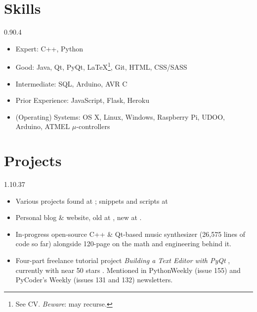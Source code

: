 \section{Skills}{0.9}{0.4}

\begin{multicols}{2}
	\begin{itemize}
		\item Expert: C++, Python
		\item Good: Java, Qt, PyQt, \LaTeX\footnote{See CV. \emph{Beware}: may recurse.}, Git, HTML, CSS/SASS
		\item Intermediate: SQL, Arduino, AVR C
		\item Prior Experience: JavaScript, Flask, Heroku
		\item (Operating) Systems: OS X, Linux, Windows, Raspberry Pi, UDOO, Arduino, ATMEL $\mu$-controllers
		\vspace{5cm}
	\end{itemize}
\end{multicols}

\section{Projects}{1.1}{0.37}

\begin{itemize}
	\item Various projects found at
	; snippets and scripts at 
	\item Personal blog \& website, old at , new at .
	\item In-progress open-source C++ \& Qt-based music synthesizer  (26,575 lines of code so far) alongside 120-page  on the math and engineering behind it.
	\item Four-part freelance tutorial project \emph{Building a Text Editor with PyQt} , currently with near 50 stars . Mentioned in PythonWeekly (issue 155) and PyCoder's Weekly (issues 131 and 132) newsletters.
\end{itemize}

